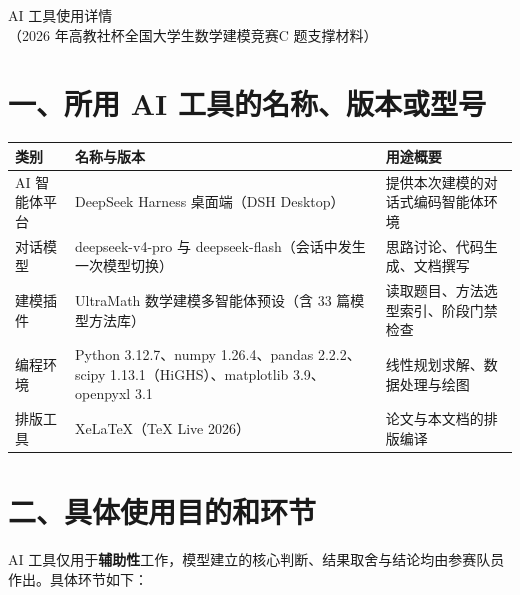 \documentclass[12pt,a4paper]{ctexart}
\begin{document}
\begin{center}
  {\heiti{} AI 工具使用详情}\\[4pt]
  { （2026 年高教社杯全国大学生数学建模竞赛\quad C 题\quad 支撑材料）}
\end{center}

\section*{一、所用 AI 工具的名称、版本或型号}

\begin{table}[h]
  \centering
  \small
  \begin{tabular}{p{3.6cm}p{4.2cm}p{7.6cm}}
    \toprule[1.5pt]
    类别 & 名称与版本 & 用途概要 \\
    \midrule[1pt]
    AI 智能体平台 & DeepSeek Harness 桌面端（DSH Desktop） & 提供本次建模的对话式编码智能体环境 \\
    对话模型 & deepseek-v4-pro 与 deepseek-flash（会话中发生一次模型切换） & 思路讨论、代码生成、文档撰写 \\
    建模插件 & UltraMath 数学建模多智能体预设（含 33 篇模型方法库） & 读取题目、方法选型索引、阶段门禁检查 \\
    编程环境 & Python 3.12.7、numpy 1.26.4、pandas 2.2.2、scipy 1.13.1（HiGHS）、matplotlib 3.9、openpyxl 3.1 & 线性规划求解、数据处理与绘图 \\
    排版工具 & XeLaTeX（TeX Live 2026） & 论文与本文档的排版编译 \\
    \bottomrule[1.5pt]
  \end{tabular}
\end{table}

\section*{二、具体使用目的和环节}

AI 工具仅用于\textbf{辅助性}工作，模型建立的核心判断、结果取舍与结论均由参赛队员作出。具体环节如下：
\end{document}
